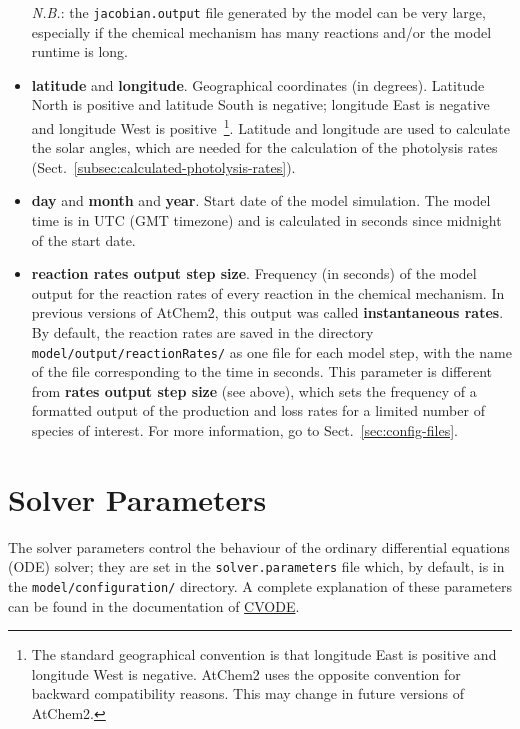 \begin{itemize}
  \emph{N.B.}: the \texttt{jacobian.output} file generated by the
  model can be very large, especially if the chemical mechanism has
  many reactions and/or the model runtime is long.
\item \textbf{latitude} and \textbf{longitude}. Geographical
  coordinates (in degrees). Latitude North is positive and latitude
  South is negative; longitude East is negative and longitude West is
  positive~\footnote{The standard geographical convention is that
    longitude East is positive and longitude West is negative. AtChem2
    uses the opposite convention for backward compatibility
    reasons. This may change in future versions of AtChem2.}. Latitude
  and longitude are used to calculate the solar angles, which are
  needed for the calculation of the photolysis rates
  (Sect.~\ref{subsec:calculated-photolysis-rates}).
\item \textbf{day} and \textbf{month} and \textbf{year}. Start date of
  the model simulation. The model time is in UTC (GMT timezone) and is
  calculated in seconds since midnight of the start date.
\item \textbf{reaction rates output step size}. Frequency (in seconds)
  of the model output for the reaction rates of every reaction in the
  chemical mechanism. In previous versions of AtChem2, this output was
  called \textbf{instantaneous rates}. By default, the reaction rates
  are saved in the directory \texttt{model/output/reactionRates/} as
  one file for each model step, with the name of the file
  corresponding to the time in seconds. This parameter is different
  from \textbf{rates output step size} (see above), which sets the
  frequency of a formatted output of the production and loss rates for
  a limited number of species of interest. For more information, go to
  Sect.~\ref{sec:config-files}.
\end{itemize}

\section{Solver Parameters} \label{sec:solver-parameters}

The solver parameters control the behaviour of the ordinary
differential equations (ODE) solver; they are set in the
\texttt{solver.parameters} file which, by default, is in the
\texttt{model/configuration/} directory. A complete explanation of
these parameters can be found in the documentation of
\href{https://computation.llnl.gov/projects/sundials/}{CVODE}.

